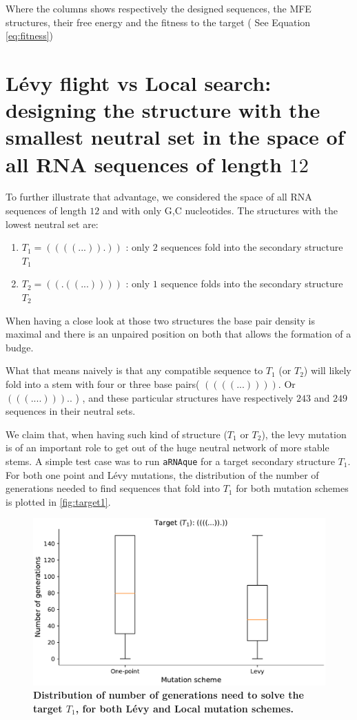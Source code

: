 \noindent Where the columns shows respectively the designed sequences, the MFE structures, their free energy and the fitness to the target ( See Equation \ref{eq:fitness})

\section{Lévy flight  vs Local search: designing the structure with the smallest neutral set in the space of all RNA sequences of length  $12$ }
\label{app:b7}
To further illustrate that advantage, we considered the space of all \ac{RNA} sequences of length  $12$ and with only G,C nucleotides. The structures with the lowest neutral set are: 

\begin{enumerate}
	\item $T_1= ((((...)).))$ : only $2$ sequences fold into the secondary structure $T_1$
	\item $T_2= ((.((...))))$ : only $1$ sequence folds into the secondary structure $T_2$
\end{enumerate}

When having a close look at those two structures the base pair density is maximal and there is an unpaired position on both that allows the formation of a budge. 

What that means naively is that any compatible sequence to $T_1$ (or $T_2$) will likely fold into a stem with four or three base pairs( $((((...)))).$ Or $(((....)))..$ ) , and these particular structures have respectively $243$ and $249$ sequences in their neutral sets. 

We claim that, when having such kind of structure ($T_1$ or $T_2$), the levy mutation is of an important role to get out of the huge neutral network of more stable stems. A simple test case was to run \texttt{aRNAque} for a target secondary structure $T_1$.  For both one point and Lévy mutations, the distribution of the number of generations needed to find sequences that fold into $T_1$ for both mutation schemes is plotted in \autoref{fig:target1}. 

\begin{figure}[H]
	\includegraphics[width=1.0\linewidth]{../res/images/aRNAque/Target1.pdf}
	\caption{\textbf{Distribution of number of generations need to solve the target $T_1$, for both Lévy and Local mutation schemes.}}
	\label{fig:target1}
\end{figure}

